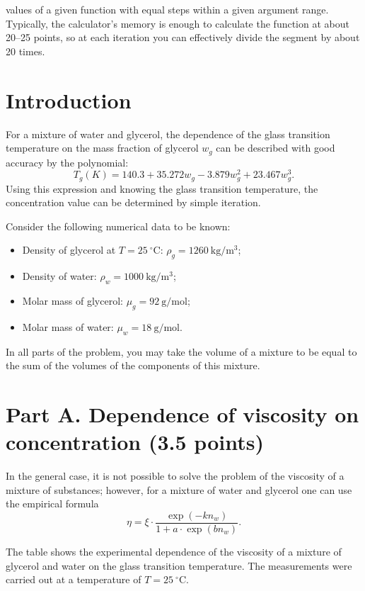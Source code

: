 \documentclass[11pt,a4paper]{article}
\begin{document}
values of a given function with equal steps within a given argument range. Typically, the calculator's memory is enough to calculate the function at about 20–25 points, so at each iteration you can effectively divide the segment by about 20 times.

\section*{Introduction}

For a mixture of water and glycerol, the dependence of the glass transition temperature on the mass fraction of glycerol $w_g$ can be described with good accuracy by the polynomial: \begin{equation}T_g(K)=140.3+35.272w_g-3.879w_g^2+ 23.467w_g^3.\tag{2}\end{equation}Using this expression and knowing the glass transition temperature, the concentration value can be determined by simple iteration.

Consider the following numerical data to be known:
\begin{itemize}
    \item Density of glycerol at $T = 25~^\circ\mathrm{C}$: $\rho_g = 1260~\mathrm{kg/m^3}$;
    \item Density of water: $\rho_w = 1000~\mathrm{kg/m^3}$;
    \item Molar mass of glycerol: $\mu_g = 92~\mathrm{g/mol}$;
    \item Molar mass of water: $\mu_w = 18~\mathrm{g/mol}$.
\end{itemize}
In all parts of the problem, you may take the volume of a mixture to be equal to the sum of the volumes of the components of this mixture.

\section*{Part A. Dependence of viscosity on concentration (3.5 points)}

In the general case, it is not possible to solve the problem of the viscosity of a mixture of substances; however, for a mixture of water and glycerol one can use the empirical formula
\[\eta = \xi\cdot\frac{\exp(-k n_w)}{1 + a\cdot\exp(b n_w)}.\]

The table shows the experimental dependence of the viscosity of a mixture of glycerol and water on the glass transition temperature. The measurements were carried out at a temperature of $T = 25~^\circ\mathrm{C}$.
\end{document}
